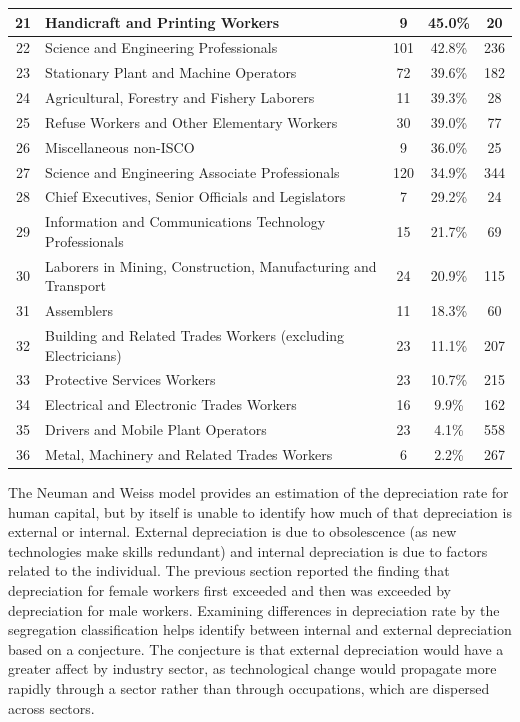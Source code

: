 \documentclass[alpha-refs]{wiley-article-02b}
\begin{document}
\begin{table}[!ht]
\begin{small}
\begin{tabular}{cp{10cm}ccc}
				21 & Handicraft and Printing Workers & 9 & 45.0\% &  20 \\ \hline
				22 & Science and Engineering Professionals & 101 & 42.8\% & 236 \\ 
				23 & Stationary Plant and Machine Operators & 72 & 39.6\% & 182 \\ 
				24 & Agricultural, Forestry and Fishery Laborers & 11 & 
				39.3\% &  28 \\ 
				25 & Refuse Workers and Other Elementary Workers & 30 & 39.0\% &  77 \\ 
				26 & Miscellaneous non-ISCO & 9 & 36.0\% &  25 \\ 
				27 & Science and Engineering Associate Professionals & 120 & 34.9\% & 344 \\ 
				28 & Chief Executives, Senior Officials and Legislators & 7 & 29.2\% &  24 \\ 
				29 & Information and Communications Technology Professionals & 15 & 21.7\% &  69 \\ 
				30 & Laborers in Mining, Construction, Manufacturing and 
				Transport & 24 & 20.9\% & 115 \\ 
				31 & Assemblers & 11 & 18.3\% &  60 \\ 
				32 & Building and Related Trades Workers (excluding Electricians) & 23 & 11.1\% & 207 \\ 
				33 & Protective Services Workers & 23 & 10.7\% & 215 \\ 
				34 & Electrical and Electronic Trades Workers & 16 & 9.9\% & 162 \\ 
				35 & Drivers and Mobile Plant Operators & 23 & 4.1\% & 558 \\ 
				36 & Metal, Machinery and Related Trades Workers & 6 & 2.2\% & 267 \\ 
				\hline
			\end{tabular}
		\end{small}
	\end{table}

The Neuman and Weiss model provides an estimation of the depreciation rate 
for human capital, but by itself is unable to identify how much of that  
depreciation is external or internal. External depreciation is due to 
obsolescence (as new technologies make skills redundant) and internal 
depreciation is due to factors related to the individual. The previous 
section reported the finding that depreciation for female workers first 
exceeded and  then was exceeded by depreciation for male workers. Examining 
differences in depreciation rate by the segregation classification helps 
identify between internal and external depreciation based on a conjecture. 
The conjecture is that external depreciation would have a greater affect by 
industry sector, as technological change would propagate more rapidly 
through a sector rather than through occupations, which are dispersed 
across sectors. 
\end{document}

